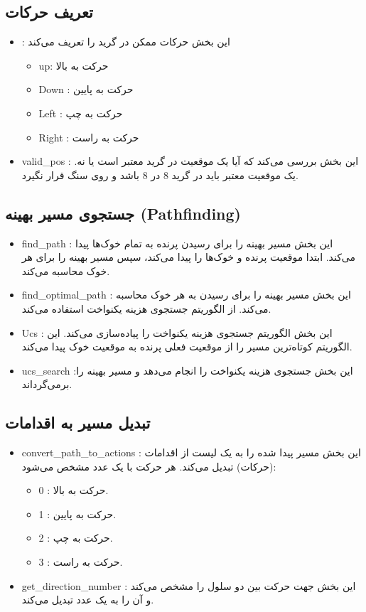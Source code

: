 \documentclass[11pt, a4paper, oneside]{article}
\begin{document}
	\subsection{تعریف حرکات 
		}
	\begin{itemize}
		\item {} : این بخش حرکات ممکن در گرید را تعریف می‌کند
		\begin{itemize}
			\item up: حرکت به بالا 
			\item Down : حرکت به پایین
			\item Left : حرکت به چپ 
			\item Right : حرکت به راست 
		\end{itemize}
		\item valid\_pos : این بخش بررسی می‌کند که آیا یک موقعیت در گرید معتبر است یا نه. یک موقعیت معتبر باید در گرید 8 در 8 باشد و روی سنگ قرار نگیرد.
	\end{itemize}

	
		\subsection{جستجوی مسیر بهینه (Pathfinding)}
		\begin{itemize}
			\item  find\_path : این بخش مسیر بهینه را برای رسیدن پرنده به تمام خوک‌ها پیدا می‌کند. ابتدا موقعیت پرنده و خوک‌ها را پیدا می‌کند، سپس مسیر بهینه را برای هر خوک محاسبه می‌کند.
			\item find\_optimal\_path : این بخش مسیر بهینه را برای رسیدن به هر خوک محاسبه می‌کند. از الگوریتم جستجوی هزینه یکنواخت 
			 استفاده می‌کند.
			\item Ucs : این بخش الگوریتم جستجوی هزینه یکنواخت را پیاده‌سازی می‌کند. این الگوریتم کوتاه‌ترین مسیر را از موقعیت فعلی پرنده به موقعیت خوک پیدا می‌کند.
			\item ucs\_search :این بخش جستجوی هزینه یکنواخت را انجام می‌دهد و مسیر بهینه را برمی‌گرداند.
		\end{itemize}

		\subsection{
		تبدیل مسیر به اقدامات 
	}
		
\begin{itemize}
	\item convert\_path\_to\_actions : این بخش مسیر پیدا شده را به یک لیست از اقدامات (حرکات) تبدیل می‌کند. هر حرکت با یک عدد مشخص می‌شود:
	\begin{itemize}
		\item  0 : حرکت به بالا.
		\item  1 : حرکت به پایین.
		\item  2 : حرکت به چپ.
		\item  3 : حرکت به راست.
	\end{itemize}
	\item get\_direction\_number : این بخش جهت حرکت بین دو سلول را مشخص می‌کند و آن را به یک عدد تبدیل می‌کند.
\end{itemize} 
\end{document}
